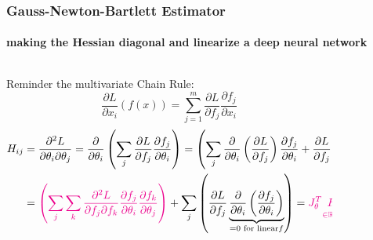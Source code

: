 \documentclass[
	11pt, %
	aspectratio=169, %
]{beamer}
\begin{document}
\begin{frame}
	\frametitle{Gauss-Newton-Bartlett Estimator }
	\framesubtitle{making the Hessian diagonal and linearize a deep neural network}
	 \begin{columns}[c] %

		\begin{column}{0.45\textwidth} %
Reminder the multivariate Chain Rule:\[
\frac{\partial L}{\partial x_i}(f(x)) = \sum_{j=1}^m \frac{\partial L}{\partial f_j} \frac{\partial f_j}{\partial x_i}
\]
				 \begin{align*}
					H_{ij} &= \frac{\partial^2 L}{\partial \theta_i \partial \theta_j} =\frac{\partial}{\partial \theta_i }\left( \sum_j \frac{\partial L}{\partial f_j} \frac{\partial f_j}{\partial \theta_i}  \right) 
				 =\left( \sum_j \frac{\partial}{\partial \theta_i } \left(\frac{\partial L}{\partial f_j}\right) \frac{\partial f_j}{\partial \theta_i} +    \frac{\partial L}{\partial f_j} \frac{\partial}{\partial \theta_i }\left( \frac{\partial f_j}{\partial \theta_i}\right) \right) \\
				 &=\textcolor{magenta}{\left( \sum_j \sum_k \frac{\partial^2 L }{\partial f_j \partial f_k }  \frac{\partial f_j}{\partial \theta_i} \frac{\partial f_k}{\partial \theta_j}\right)}+ \sum_j \left(  \frac{\partial L}{\partial f_j} \underbrace{\frac{\partial}{\partial \theta_i }\left( \frac{\partial f_j}{\partial \theta_i}\right)}_{=0 \text{ for linear}f} \right)  = \textcolor{magenta}{J_\theta^T \underset{\in \mathbb{R}^{c\times c}}{H_f} J_\theta} +  smol
				 \end{align*}
		\end{column}
		\begin{column}{0.55\textwidth} %
        	\begin{figure}
        	    \centering
        	\end{figure}
		\end{column}
	\end{columns}
\end{frame}
 
\end{document}
